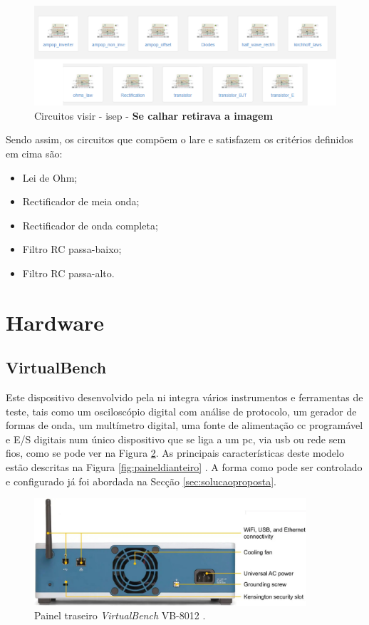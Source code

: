 \begin{figure}[hbtp]
	\centering
	\includegraphics[width=1\textwidth]{figures/visir_ISEP.png}
	\caption{Circuitos \acrshort{visir} - \acrshort{isep} - \textbf{Se calhar retirava a imagem}}
	\label{fig:circuitosvisir}
\end{figure}

Sendo assim, os circuitos que compõem o \acrshort{lare} e satisfazem os critérios definidos em cima são:
\begin{itemize}
	\item Lei de Ohm;
	\item Rectificador de meia onda;
	\item Rectificador de onda completa;
	\item Filtro RC passa-baixo;
	\item Filtro RC passa-alto.
\end{itemize}

\section{Hardware}
\label{sec:hardware}
\subsection{VirtualBench}
Este dispositivo desenvolvido pela \acrshort{ni} integra vários instrumentos e ferramentas de teste, tais como um osciloscópio digital com análise de protocolo, um gerador de formas de onda, um multímetro digital, uma fonte de alimentação \acrfull{cc} programável e E/S digitais num único dispositivo que se liga a um \acrshort{pc}, via \acrshort{usb} ou rede sem fios, como se pode ver na Figura \ref{fig:paineltraseiro}. As principais características deste modelo estão descritas na Figura \ref{fig:paineldianteiro} \cite{datasheetVirtualBench}. A forma como pode ser controlado e configurado já foi abordada na Secção \ref{sec:solucaoproposta}.

\begin{figure}[hbtp]
	\centering
	\centering
	\includegraphics[width=0.9\textwidth]{figures/virtualbench_back-panel.jpg}
	\caption{Painel traseiro \textit{VirtualBench} VB-8012  \cite{datasheetVirtualBench}.}
	\label{fig:paineltraseiro}
\end{figure}

